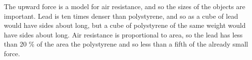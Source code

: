 \begin{problem}[O1978PIIQ1a]
{\begin{enumerate}
The upward force is a model for air resistance, and so the sizes of the objects are important. Lead is ten times denser than polystyrene, and so as a cube  of lead would have sides about  long, but a cube of polystyrene of the same weight would have sides about  long. Air resistance is proportional to area, so the lead has less than 20 \% of the area the polystyrene and so less than a fifth of the already small force.
\end{enumerate}
}
\end{problem}